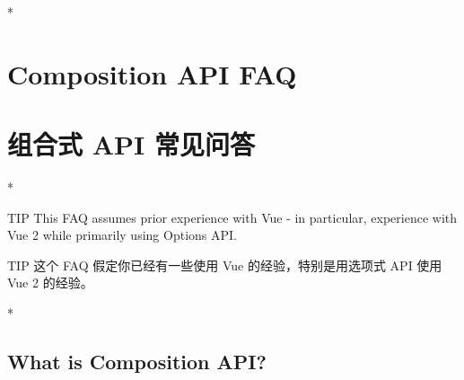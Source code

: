 
\begin{paracol}{2} 
 
\switchcolumn[0]*%
\section{Composition API FAQ}
\switchcolumn
\section{组合式 API 常见问答}
\switchcolumn[0]*%
\begin{vueQuote}{TIP}
This FAQ assumes prior experience with Vue - in particular, experience
with Vue 2 while primarily using Options API.
\end{vueQuote} 
\switchcolumn
\begin{vueQuote}{TIP}
这个 FAQ 假定你已经有一些使用 Vue 的经验，特别是用选项式 API 使用 Vue 2
的经验。
\end{vueQuote} 
\switchcolumn[0]*%
\subsection{What is Composition API?}
\switchcolumn

\end{paracol}
